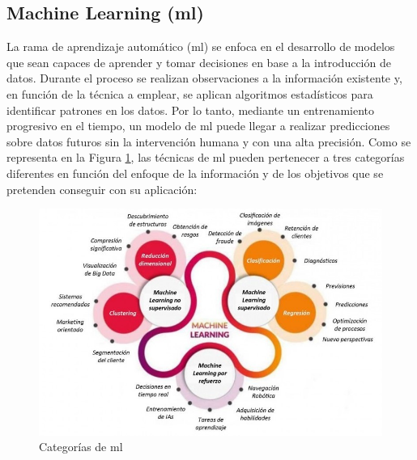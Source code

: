 \subsection{Machine Learning (\acrshort{ml})}
\label{sec:ml}

La rama de aprendizaje automático (\acrfull{ml}) se enfoca en el desarrollo de modelos que sean capaces de aprender y tomar decisiones en base a la introducción de datos. Durante el proceso se realizan observaciones a la información existente y, en función de la técnica a emplear, se aplican algoritmos estadísticos para identificar patrones en los datos. Por lo tanto, mediante un entrenamiento progresivo en el tiempo, un modelo de \gls{ml} puede llegar a realizar predicciones sobre datos futuros sin la intervención humana y con una alta precisión. Como se representa en la Figura \ref{fig:ml}, las técnicas de \gls{ml} pueden pertenecer a tres categorías diferentes en función del enfoque de la información y de los objetivos que se pretenden conseguir con su aplicación: \cite{mlcat} \cite{iageeks} \cite{mltlf}

\vspace{3mm}

\begin{figure}[h!]
    \centering
    \includegraphics[width=1\textwidth]{img/teoria/ml.jpeg}
    \caption{Categorías de \acrshort{ml} \cite{metal}}
    \label{fig:ml}
\end{figure}

